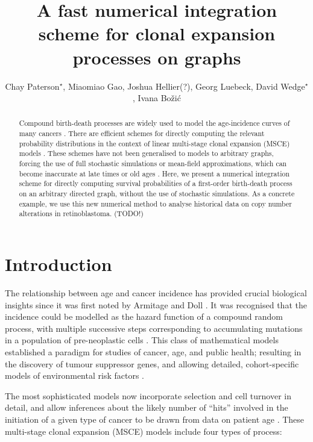 \documentclass{article}
\title{A fast numerical integration scheme for clonal expansion processes on graphs}
\author{Chay Paterson${}^\star$, Miaomiao Gao, Joshua Hellier(?), Georg Luebeck, David Wedge${}^\star$, Ivana Bo\v{z}i\'{c}}
\begin{document}
\maketitle

\begin{abstract}
Compound birth-death processes are widely used to model the age-incidence curves
of many cancers \cite{luebeck2013impact}. There are efficient schemes for
directly computing the relevant %
probability distributions in the context of linear multi-stage clonal expansion
(MSCE) models \cite{meza2008age}. These schemes have not been generalised to
models to arbitrary graphs, forcing the use of full stochastic simulations or
mean-field approximations, which can become inaccurate at late times or old ages
\cite{patersonbozic2020colorectal,Paterson2021vs}.
Here, we present a numerical integration scheme for directly computing survival
probabilities of a first-order birth-death process on an arbitrary
directed graph, without the use of stochastic
simulations. As a concrete example, we use this new numerical method to analyse
historical data on copy number alterations in retinoblastoma. (TODO!)
\end{abstract}

\section{Introduction}

The relationship between age and cancer incidence has provided crucial
biological insights since it was first noted by Armitage and Doll
\cite{armitage_doll,armitage1957two,knudson1971mutation}. It was 
recognised that the incidence could be modelled as the hazard function of a
compound random process, with multiple successive steps corresponding to
accumulating mutations in a population of pre-neoplastic cells
\cite{armitage_doll,moolgavkar1979two}. This class of mathematical models
established a paradigm for studies of cancer, age, and public health; resulting
in the discovery of tumour suppressor genes, and allowing detailed,
cohort-specific models of environmental risk factors
\cite{knudson1971mutation,conolly2003biologically,meza2008age}. 

The most sophisticated
models now incorporate selection and cell turnover in detail, and allow
inferences about the likely number of ``hits'' involved in the initiation of a
given type of cancer to be drawn from data on patient age \cite{moolgavkar1992multistage,luebeck2013impact}. These multi-stage clonal expansion (MSCE) models include four types of process:
\end{document}
